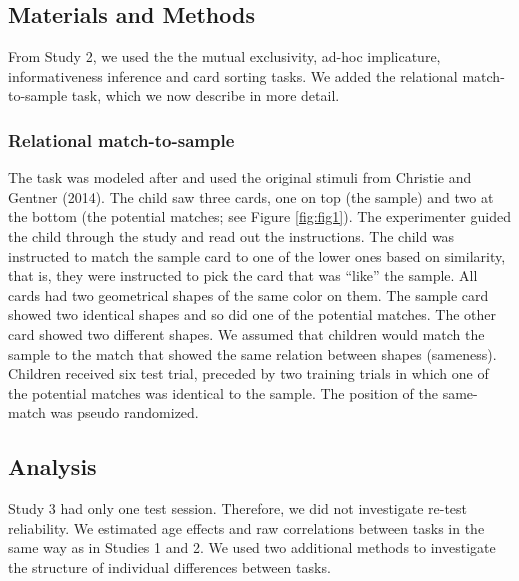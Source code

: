 \documentclass[
  man,floatsintext]{apa6}
\begin{document}
\hypertarget{materials-and-methods}{%
\subsection{Materials and Methods}\label{materials-and-methods}}

From Study 2, we used the the mutual exclusivity, ad-hoc implicature, informativeness inference and card sorting tasks. We added the relational match-to-sample task, which we now describe in more detail.

\hypertarget{relational-match-to-sample}{%
\subsubsection{Relational match-to-sample}\label{relational-match-to-sample}}

The task was modeled after and used the original stimuli from Christie and Gentner (2014). The child saw three cards, one on top (the sample) and two at the bottom (the potential matches; see Figure \ref{fig:fig1}). The experimenter guided the child through the study and read out the instructions. The child was instructed to match the sample card to one of the lower ones based on similarity, that is, they were instructed to pick the card that was ``like'' the sample. All cards had two geometrical shapes of the same color on them. The sample card showed two identical shapes and so did one of the potential matches. The other card showed two different shapes. We assumed that children would match the sample to the match that showed the same relation between shapes (sameness). Children received six test trial, preceded by two training trials in which one of the potential matches was identical to the sample. The position of the same-match was pseudo randomized.

\hypertarget{analysis-2}{%
\subsection{Analysis}\label{analysis-2}}

Study 3 had only one test session. Therefore, we did not investigate re-test reliability. We estimated age effects and raw correlations between tasks in the same way as in Studies 1 and 2. We used two additional methods to investigate the structure of individual differences between tasks.
\end{document}
